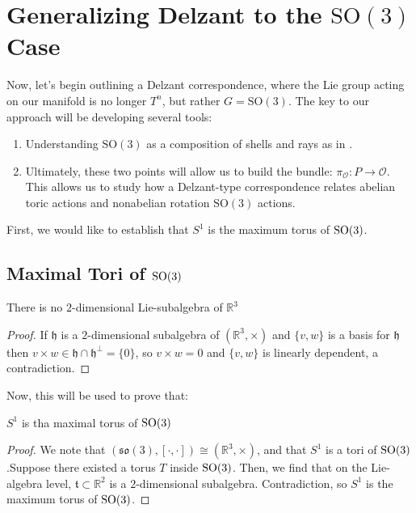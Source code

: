 \section{Generalizing Delzant to the $\mathrm{SO}(3)$ Case}
Now, let's begin outlining a Delzant correspondence, where the Lie group acting on our manifold is no longer $T^{n}$, but rather $G = \mathrm{SO}(3)$. The key to our approach will be developing several tools:
\begin{enumerate}
    \item Understanding $\mathrm{SO}(3)$ as a composition of shells and rays as in  \textcite{Blaom1996}.
    \item Ultimately, these two points will allow us to build the bundle: $\pi_{\mathcal{O}}: P \to \mathcal{O}$. This allows us to study how a Delzant-type correspondence relates abelian toric actions and nonabelian rotation $\mathrm{SO}(3)$ actions.
\end{enumerate}

First, we would like to establish that $S^{1}$ is the maximum torus of $\rm{SO}(3)$. 

\subsection{Maximal Tori of $\rm{SO}(3)$}

\begin{lemma}
There is no $2$-dimensional Lie-subalgebra of $\mathbb{R}^{3}$
\end{lemma}
\begin{proof}
If $\mathfrak{h}$ is a $2$-dimensional subalgebra of $(\mathbb{R}^{3}, \times)$ and $\{v, w \}$ is a basis for $\mathfrak{h}$ then $v \times w \in \mathfrak{h} \cap \mathfrak{h}^{\perp} = \{0\}$, so $v \times w = 0$ and $\{v, w \}$ is linearly dependent, a contradiction.
\end{proof}

Now, this will be used to prove that: 

\begin{lemma}
$S^{1}$ is tha maximal torus of $\rm{SO}(3)$
\end{lemma}

\begin{proof}
We note that $(\mathfrak{so}(3), [\cdot, \cdot]) \cong (\mathbb{R}^{3}, \times)$, and that $S^{1}$ is a tori of $\rm{SO}(3)$.Suppose there existed a torus $T$ inside $\rm{SO}(3)$. Then, we find that on the Lie-algebra level, $\mathfrak{t} \subset \mathbb{R}^{2}$ is a $2$-dimensional subalgebra. Contradiction, so $S^{1}$ is the maximum torus of $\rm{SO}(3)$. 
\end{proof}

